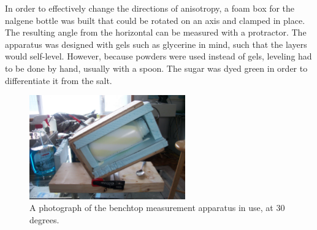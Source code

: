 In order to effectively change the directions of anisotropy, a foam box for the
nalgene bottle was built that could be rotated on an axis and clamped in place.
The resulting angle from the horizontal can be measured with a protractor. The apparatus was designed with gels such as glycerine in mind, such that the layers
would self-level. However, because powders were used instead of gels, leveling
had to be done by hand, usually with a spoon. The sugar was dyed green in order
 to differentiate it from the salt.

\begin{figure}[h]
\centering
\includegraphics[width=0.6\textwidth]{fig/tilter_irl.jpg}
\caption{A photograph of the benchtop measurement apparatus in use, at 30 degrees.}
\label{fig:tilter}
\end{figure}
